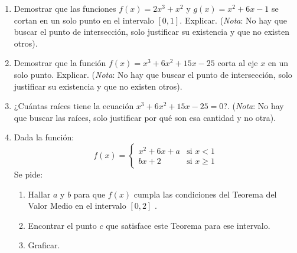 \documentclass[12pt]{article}
\theoremstyle{definition}
\begin{document}
\begin{enumerate}

\item  
Demostrar que las funciones $f(x) = 2x^3 + x^2$ y $g(x) = x^2+6x -1$ se cortan en un solo punto en el intervalo $[0,1]$. Explicar. (\textit{Nota}: No hay que buscar el punto de intersección, solo justificar su existencia y que no existen otros).
\item  
Demostrar que la función $f(x) = x^3 + 6x^2+15x-25$ corta al eje $x$ en un solo punto. Explicar. (\textit{Nota}: No hay que buscar el punto de intersección, solo justificar su existencia y que no existen otros).
\item  
¿Cuántas raíces tiene la ecuación $x^3 + 6x^2 + 15x - 25 = 0$?.  (\textit{Nota}: No hay que buscar las raíces, solo justificar por qué son esa cantidad y no otra).

\item  
Dada la función:
\begin{equation*}
	f(x) = 
	\begin{cases} 
		x^2+6x+a  & \text{si  } x <1 \\
		bx+2  & \text{si  } x \geq 1
	\end{cases}
\end{equation*}
Se pide:
\begin{enumerate}
\item Hallar $a$ y $b$ para que $f(x)$ cumpla las condiciones del Teorema del Valor Medio en el intervalo $[0,2]$ .
\item Encontrar el punto $c$ que satisface este Teorema para ese intervalo.
\item Graficar.
\end{enumerate}

\end{enumerate}
\end{document}
